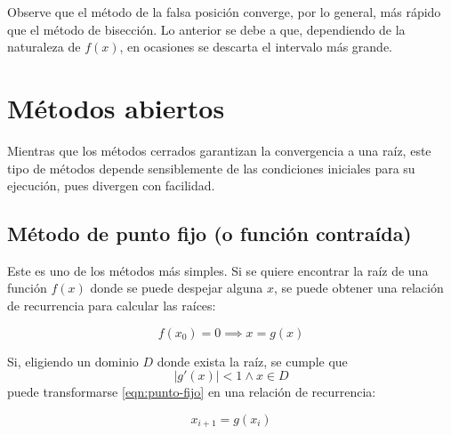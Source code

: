 Observe que el método de la falsa posición converge, por lo general, más rápido
que el método de bisección. Lo anterior se debe a que, dependiendo de la
naturaleza de $f(x)$, en ocasiones se descarta el intervalo más grande.


\section{Métodos abiertos}

Mientras que los métodos cerrados garantizan la convergencia a una raíz, este
tipo de métodos depende sensiblemente de las condiciones iniciales para su
ejecución, pues divergen con facilidad.

\subsection{Método de punto fijo (o función contraída)}

Este es uno de los métodos más simples. Si se quiere encontrar la raíz de una
función $f(x)$ donde se puede despejar alguna $x$, se puede obtener una
relación de recurrencia para calcular las raíces:

\begin{equation}\label{eqn:punto-fijo}
    f(x_0) = 0 \implies \boxed{x = g(x)}
\end{equation}

Si, eligiendo un dominio $D$ donde exista la raíz, se cumple que
\[
    \left| g'(x) \right| < 1 \land x \in D
\]
puede transformarse \ref{eqn:punto-fijo} en una relación de
recurrencia:

\begin{equation} \label{eqn:recurrencia-punto-fijo}
    \boxed{x_{i+1} = g(x_i)}
\end{equation}

